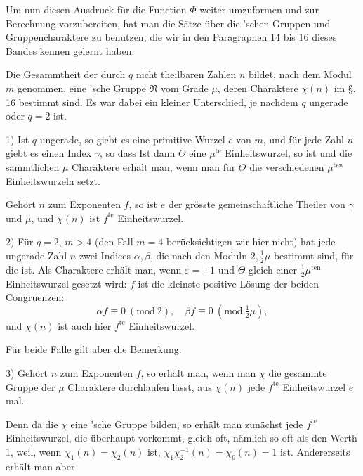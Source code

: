 Um nun diesen Ausdruck für die Function $\varPhi$ weiter umzuformen
und zur Berechnung vorzubereiten, hat man die Sätze
über die 'schen Gruppen und Gruppencharaktere zu benutzen,
die wir in den Paragraphen 14 bis 16 dieses Bandes
kennen gelernt haben.

Die Gesammtheit der durch $q$ nicht theilbaren Zahlen $n$
bildet, nach dem Modul $m$ genommen, eine 'sche Gruppe $\mathfrak{N}$
vom Grade $\mu$, deren Charaktere $\chi(n)$ im \S.\,16 bestimmt sind. Es
war dabei ein kleiner Unterschied, je nachdem $q$ ungerade oder
$q=2$ ist.

1) Ist $q$ ungerade, so giebt es eine primitive Wurzel $c$ von $m$,
und für jede Zahl $n$ giebt es einen Index $\gamma$, so dass
Ist dann $\Theta$ eine $\mu^{\text{te}}$ Einheitswurzel, so ist
und die sämmtlichen $\mu$ Charaktere erhält man, wenn man für $\Theta$
die verschiedenen $\mu^{\text{ten}}$ Einheitswurzeln setzt.

Gehört $n$ zum Exponenten $f$, so ist $e$ der grösste gemeinschaftliche
Theiler von $\gamma$ und $\mu$, und $\chi(n)$ ist $f^{\text{te}}$ Einheitswurzel.

2) Für $q=2$, $m>4$ (den Fall $m=4$ berücksichtigen wir
hier nicht) hat jede ungerade Zahl $n$ zwei Indices $\alpha, \beta$, die nach
den Moduln $2, \frac{1}{2}\mu$ bestimmt sind, für die
ist. Als Charaktere erhält man, wenn $\varepsilon = \pm 1$ und $\Theta$ gleich
einer $\frac{1}{2}\mu^{\text{ten}}$ Einheitswurzel gesetzt wird:
$f$ ist die kleinste positive Lösung der beiden Congruenzen:
\[
\alpha f \equiv 0\ (\mathrm{mod}\ 2), \quad \beta f \equiv 0\ (\mathrm{mod}\ \tfrac{1}{2}\mu),
\]
und $\chi(n)$ ist auch hier $f^{\text{te}}$ Einheitswurzel.

Für beide Fälle gilt aber die Bemerkung:

3) Gehört $n$ zum Exponenten $f$, so erhält man, wenn man $\chi$
die gesammte Gruppe der $\mu$ Charaktere durchlaufen lässt, aus
$\chi(n)$ jede $f^{\text{te}}$ Einheitswurzel $e$ mal.

Denn da die $\chi$ eine 'sche Gruppe bilden, so erhält
man zunächst jede $f^{\text{te}}$ Einheitswurzel, die überhaupt vorkommt,
gleich oft, nämlich so oft als den Werth 1, weil, wenn $\chi_1(n)=\chi_2(n)$
ist, $\chi_1\chi_2^{-1}(n) = \chi_0(n) = 1$ ist. Andererseits erhält man aber
